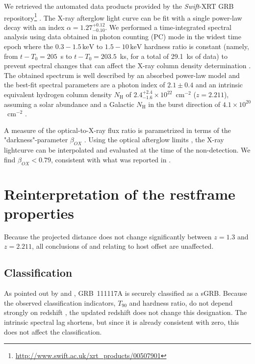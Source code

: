 \documentclass{aa}    %
\begin{document}
We retrieved the automated data products provided by the \textit{Swift}-XRT GRB
repository\footnote{\url{http://www.swift.ac.uk/xrt\_products/00507901}}
\citep{Evans2009}. 
The X-ray afterglow light curve can be fit with a single power-law decay with an
index $\alpha=1.27_{-0.10}^{+0.12}$. We performed a time-integrated spectral
analysis using data obtained in photon counting (PC) mode in the widest time epoch where
the $0.3-1.5\,\mathrm{keV}$ to $1.5-10\,\mathrm{keV}$ hardness ratio is constant
(namely, from $t-T_0 = 205$~s to $t-T_0 = 203.5$~ks, for a total of 29.1~ks of
data) to prevent spectral changes that can affect the X-ray column density
determination \citep{Kopac2012}. 
The obtained spectrum is well described by an absorbed power-law
model and the best-fit spectral parameters are a photon index of $2.1 \pm 0.4$ and
an intrinsic equivalent hydrogen column density $N_{\mathrm{H}}$ of $2.4_{-1.6}^{+2.4}
\times 10^{22}$~cm$^{-2}$ ($z=2.211$), assuming a solar abundance and a Galactic $N_{\mathrm{H}}$ in
the burst direction of $4.1 \times 10^{20}$~cm$^{-2}$ \citep{Willingale2013}.

A measure of the optical-to-X-ray flux ratio is parametrized in terms of the
"darkness"-parameter $\beta_{OX} $ \citep{Jakobsson2004}. Using the optical
afterglow limits \citep{Cucchiara2011, Cenko2011}, the X-ray lightcurve can be
interpolated and evaluated at the time of the non-detection. We find $\beta_{OX}
< 0.79$, consistent with what was reported in \citet{Sakamoto2013}.
\section{Reinterpretation of the restframe properties}

Because the projected distance does not change significantly between $z = 1.3$ and $z =
2.211$, all conclusions of \citet{Margutti2012} and \citet{Sakamoto2013}
relating to host offset are unaffected.

\subsection{Classification} \label{classification}

As pointed out by \citet{Margutti2012} and \citet{Sakamoto2013}, GRB~111117A is
securely classified as a sGRB. Because the observed classification indicators,
$T_{90}$ and hardness ratio, do not depend strongly on redshift
\citep{Littlejohns2013a}, the updated redshift does not change this designation.
The intrinsic spectral lag shortens, but since it is already consistent with
zero, this does not affect the classification.
\end{document}
